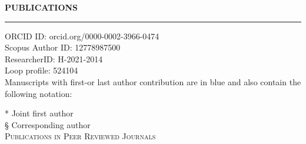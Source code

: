 \documentclass[openany]{book}
\begin{document}
\vspace{0.4cm}
\noindent
\MakeUppercase{\textbf{Publications}} \vspace{0.2cm}
\sectionlineskip
\hrule
\vspace{0.2cm}
\noindent
ORCID ID: orcid.org/0000-0002-3966-0474\\
Scopus Author ID: 12778987500\\
ResearcherID: H-2021-2014\\
Loop profile: 524104 \\

Manuscripts with first-or last author contribution are in {\color{blue}blue} and also contain the following notation: 


\noindent
* Joint first author\\ 
§ Corresponding author\\ 
 
 
\noindent
\textsc{Publications in Peer Reviewed Journals}\vspace{0.5em}
\end{document}
